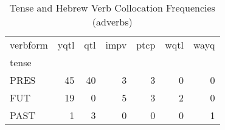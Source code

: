 \begin{table}[htbp!]
\centering
\caption{Tense and Hebrew Verb Collocation Frequencies (adverbs)}
\label{table:advb_tense_ct}
\begin{tabular}{lrrrrrr}
\toprule
verbform &  yqtl &  qtl &  impv &  ptcp &  wqtl &  wayq \\
tense &       &      &       &       &       &       \\
\midrule
PRES  &    45 &   40 &     3 &     3 &     0 &     0 \\
FUT   &    19 &    0 &     5 &     3 &     2 &     0 \\
PAST  &     1 &    3 &     0 &     0 &     0 &     1 \\
\bottomrule
\end{tabular}
\end{table}
